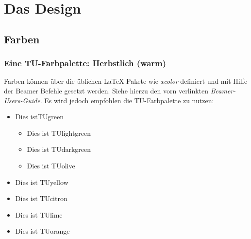 \documentclass[9pt]{beamer}
\begin{document}
\section{Das Design}
\subsection{Farben}
\begin{frame}
    \frametitle{Eine TU-Farbpalette: Herbstlich (warm)}
    Farben können über die üblichen \LaTeX-Pakete wie \emph{xcolor} definiert und mit Hilfe der Beamer Befehle gesetzt werden.
    Siehe hierzu den vorn verlinkten \emph{Beamer-Users-Guide}. Es wird jedoch empfohlen die TU-Farbpalette zu nutzen:
    \begin{itemize}
        \item \textcolor{TUgreen}{Dies istTUgreen}
            \begin{itemize}
                \item \textcolor{TUlightgreen}{Dies ist TUlightgreen}
                \item \textcolor{TUdarkgreen}{Dies ist TUdarkgreen}
                \item \textcolor{TUolive}{Dies ist TUolive}
            \end{itemize}
        \item \textcolor{TUyellow}{Dies ist TUyellow}
        \item \textcolor{TUcitron}{Dies ist TUcitron}
        \item \textcolor{TUlime}{Dies ist TUlime}
        \item \textcolor{TUorange}{Dies ist TUorange}
    \end{itemize}
\end{frame}
\end{document}

